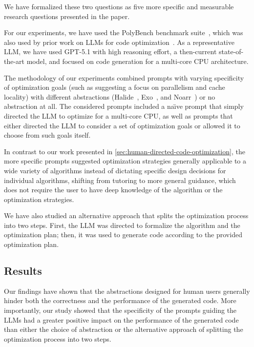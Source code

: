 We have formalized these two questions as five more specific and measurable research questions presented in the paper.

For our experiments, we have used the PolyBench benchmark suite~\cite{polybench4.2.1}, which was also used by prior work on LLMs for code optimization~\cite{merouani2025agentic}. As a representative LLM, we have used GPT-5.1 with high reasoning effort, a then-current state-of-the-art model, and focused on code generation for a multi-core CPU architecture.

The methodology of our experiments combined prompts with varying specificity of optimization goals (such as suggesting a focus on parallelism and cache locality) with different abstractions (Halide~\cite{ragan2013halide}, Exo~\cite{ikarashi2022exocompilation}, and Noarr~\cite{klepl2024abstractions}) or no abstraction at all. The considered prompts included a na\"{\i}ve prompt that simply directed the LLM to optimize for a multi-core CPU, as well as prompts that either directed the LLM to consider a set of optimization goals or allowed it to choose from such goals itself.

In contrast to our work presented in \cref{sec:human-directed-code-optimization}, the more specific prompts suggested optimization strategies generally applicable to a wide variety of algorithms instead of dictating specific design decisions for individual algorithms, shifting from tutoring to more general guidance, which does not require the user to have deep knowledge of the algorithm or the optimization strategies.

We have also studied an alternative approach that splits the optimization process into two steps. First, the LLM was directed to formalize the algorithm and the optimization plan; then, it was used to generate code according to the provided optimization plan.


\subsection{Results}\label{sec:llms-results}

Our findings have shown that the abstractions designed for human users generally hinder both the correctness and the performance of the generated code. More importantly, our study showed that the specificity of the prompts guiding the LLMs had a greater positive impact on the performance of the generated code than either the choice of abstraction or the alternative approach of splitting the optimization process into two steps.

